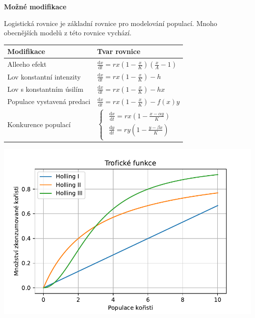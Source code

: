 \documentclass[handouts]{beamer}
\def\subsection#1{\par {\bfseries #1}\par\smallskip}
\begin{document}
\begin{frame}
\subsection{Možné modifikace}

Logistická rovnice je základní rovnice pro modelování populací. Mnoho obecnějších modelů z této rovnice vychází.

\begin{minipage}[t]{0.45\linewidth}
  \vspace*{0pt}
\everymath{\displaystyle}
\begin{tabular}{ll}
  \toprule
  Modifikace&Tvar rovnice\\
  \midrule
Alleeho efekt & $\frac{\mathrm dx}{\mathrm dt}=rx\left(1-\frac xK\right)\left(\frac
xA-1\right)$\\[5mm]
Lov konstantní intenzity & $\frac{\mathrm dx}{\mathrm dt}=rx\left(1-\frac xK\right)-h$\\[5mm]
Lov s konstantním úsilím & $\frac{\mathrm dx}{\mathrm dt}=rx\left(1-\frac xK\right)-hx$\\[5mm]
Populace vystavená predaci & $\frac{\mathrm dx}{\mathrm dt}=rx\left(1-\frac xK\right)-f(x)y$\\[5mm]
  Konkurence populací & $\begin{cases}
                        \begin{aligned}
           \frac{\mathrm dx}{\mathrm dt}=rx\left(1-\frac {x-\alpha y}K\right)\\
           \frac{\mathrm dy}{\mathrm dt}=ry\left(1-\frac {y-\beta x}K\right)
                        \end{aligned}
\end{cases}
$\\
  \bottomrule
\end{tabular}

\end{minipage}\hfill
\begin{minipage}[t]{0.45\linewidth}
  \vspace*{0pt}

  \includegraphics[width=\linewidth]{holling.pdf}


\end{minipage}
\end{frame}
\end{document}
